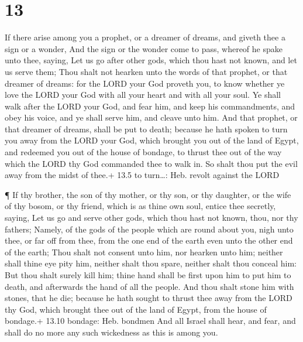 \hypertarget{section-12}{%
\section{13}\label{section-12}}

 If there arise among you a prophet, or a dreamer of dreams,
and giveth thee a sign or a wonder,  And the sign or the
wonder come to pass, whereof he spake unto thee, saying, Let us go after
other gods, which thou hast not known, and let us serve them;
 Thou shalt not hearken unto the words of that prophet, or
that dreamer of dreams: for the LORD your God proveth you, to know
whether ye love the LORD your God with all your heart and with all your
soul.  Ye shall walk after the LORD your God, and fear him,
and keep his commandments, and obey his voice, and ye shall serve him,
and cleave unto him.  And that prophet, or that dreamer of
dreams, shall be put to death; because he hath spoken to turn you away
from the LORD your God, which brought you out of the land of Egypt, and
redeemed you out of the house of bondage, to thrust thee out of the way
which the LORD thy God commanded thee to walk in. So shalt thou put the
evil away from the midst of thee.+ 13.5 to turn\ldots: Heb. revolt
against the LORD

 ¶ If thy brother, the son of thy mother, or thy son, or thy
daughter, or the wife of thy bosom, or thy friend, which is as thine own
soul, entice thee secretly, saying, Let us go and serve other gods,
which thou hast not known, thou, nor thy fathers;  Namely,
of the gods of the people which are round about you, nigh unto thee, or
far off from thee, from the one end of the earth even unto the other end
of the earth;  Thou shalt not consent unto him, nor hearken
unto him; neither shall thine eye pity him, neither shalt thou spare,
neither shalt thou conceal him:  But thou shalt surely kill
him; thine hand shall be first upon him to put him to death, and
afterwards the hand of all the people.  And thou shalt
stone him with stones, that he die; because he hath sought to thrust
thee away from the LORD thy God, which brought thee out of the land of
Egypt, from the house of bondage.+ 13.10 bondage: Heb. bondmen
 And all Israel shall hear, and fear, and shall do no more
any such wickedness as this is among you.

